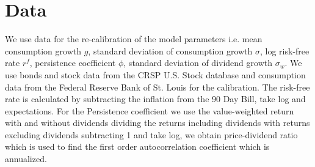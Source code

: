 \section{Data} \label{sec:Data}

We use data for the re-calibration of the model parameters i.e. mean consumption growth $g$, standard deviation of consumption growth $\sigma$, log risk-free rate $r^f$, persistence coefficient $\phi$, standard deviation of dividend growth $\sigma_w$. We use bonds and stock data from the CRSP U.S. Stock database and consumption data from the Federal Reserve Bank of St. Louis for the calibration. 
The risk-free rate is calculated by subtracting the inflation from the 90 Day Bill, take log and expectations. For the Persistence coefficient we use the value-weighted return with and without dividends dividing the returns including dividends with returns excluding dividends subtracting 1 and take log, we obtain price-dividend ratio which is used to find the first order autocorrelation coefficient which is annualized. 









